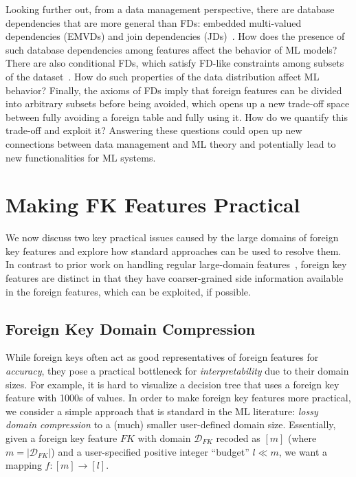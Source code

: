 \documentclass{vldb}
\begin{document}
Looking further out, from a data management perspective, there are database dependencies that are more general than FDs: 
embedded multi-valued dependencies (EMVDs) and join dependencies (JDs)~\cite{avibook}. How does the presence of such 
database dependencies among features affect the behavior of ML models? There are also conditional FDs, which satisfy FD-like 
constraints among subsets of the dataset~\cite{condfds}. How do such properties of the data distribution affect ML behavior?
Finally, the axioms of FDs imply that foreign features can be divided into arbitrary subsets before being avoided, which opens 
up a new trade-off space between fully avoiding a foreign table and fully using it. How do we quantify this trade-off and exploit it?
Answering these questions could open up new connections between data management and ML theory and potentially lead to 
new functionalities for ML systems.

\section{Making FK Features Practical}

We now discuss two key practical issues caused by the large domains of foreign key features and explore how standard approaches can be used to resolve them. 
In contrast to prior work on handling regular large-domain features~\cite{dtreebias1}, foreign key features are distinct in that they have coarser-grained 
side information available in the foreign features, which can be exploited, if possible.

\subsection{Foreign Key Domain Compression}

While foreign keys often act as good representatives of foreign features for \textit{accuracy},
they pose a practical bottleneck for \textit{interpretability} due to their domain sizes.
For example, it is hard to visualize a decision tree that uses a foreign key feature with 1000s of values.
In order to make foreign key features more practical, we consider a simple approach that is standard in the ML literature:
\textit{lossy domain compression} to a (much) smaller user-defined domain size. Essentially, given a 
foreign key feature $FK$ with domain $\mathcal{D}_{FK}$ recoded as $[m]$ (where $m = |\mathcal{D}_{FK}|$) and a user-specified 
positive integer ``budget'' $l \ll m$, we want a mapping $f: [m] \rightarrow [l]$.
\end{document}
